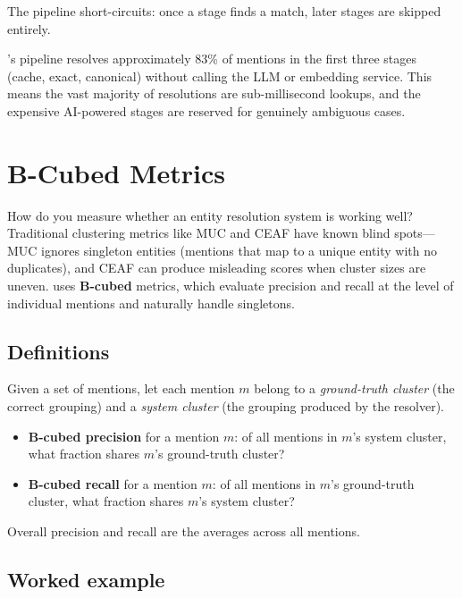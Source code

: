 The pipeline short-circuits: once a stage finds a match, later stages are
skipped entirely.

\begin{keyinsight}
\sysname{}'s pipeline resolves approximately 83\% of mentions in the first
three stages (cache, exact, canonical) without calling the LLM or embedding
service. This means the vast majority of resolutions are sub-millisecond
lookups, and the expensive AI-powered stages are reserved for genuinely
ambiguous cases.
\end{keyinsight}

\section{B-Cubed Metrics}
\label{sec:bcubed-metrics}

How do you measure whether an entity resolution system is working well?
Traditional clustering metrics like MUC and CEAF have known blind spots---MUC
ignores singleton entities (mentions that map to a unique entity with no
duplicates), and CEAF can produce misleading scores when cluster sizes are
uneven. \sysname{} uses \textbf{B-cubed} metrics, which evaluate precision and
recall at the level of individual mentions and naturally handle singletons.

\subsection{Definitions}

Given a set of mentions, let each mention $m$ belong to a \emph{ground-truth
cluster} (the correct grouping) and a \emph{system cluster} (the grouping
produced by the resolver).

\begin{itemize}
    \item \textbf{B-cubed precision} for a mention $m$: of all mentions in
          $m$'s system cluster, what fraction shares $m$'s ground-truth cluster?
    \item \textbf{B-cubed recall} for a mention $m$: of all mentions in $m$'s
          ground-truth cluster, what fraction shares $m$'s system cluster?
\end{itemize}

\noindent Overall precision and recall are the averages across all mentions.

\subsection{Worked example}

